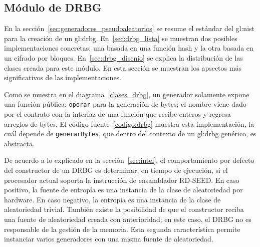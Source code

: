 %
%
%

\subsection{Módulo de DRBG}
\label{sec:implementacion_drbg}

En la sección~\ref{sec:generadores_pseudoaleatorios} se resume el estándar del
\gls{gl:nist} para la  creación de un \gls{gl:drbg}. En~\ref{sec:drbg_lista} se
muestran dos posibles implementaciones concretas: una basada en una función
hash y la  otra basada en un cifrado por bloques. En~\ref{sec:drbg_disenio} se
explica la distribución de las clases creada para este módulo. En esta sección
se muestran los apsectos más significativos de las implementaciones.


Como se muestra en el diagrama~\ref{clases_drbg}, un generador solamente
expone una función pública: \texttt{operar} para la generación de bytes; el
nombre viene dado por el contrato con la interfaz de una función que
recibe enteros y regresa arreglos de bytes. El código fuente~\ref{codigo:drbg}
muestra esta implementación, la cuál depende de \texttt{generarBytes}, que
dentro del contexto de un \gls{gl:drbg} genérico, es abstracta.

De acuerdo a lo explicado en la sección~\ref{sec:intel}, el comportamiento por
defecto del constructor de un DRBG es determinar, en tiempo de ejecución, si el
procesador actual soporta la instrucción de ensamblador RD-SEED. En caso
positivo, la fuente de entropía es una instancia de la clase de aleatoriedad
por hardware. En caso negativo, la entropía es una instancia de la clase de
aleatoriedad trivial. También existe la posibilidad de que el constructor
reciba una fuente de aleatoriedad creada con anterioridad; en este caso, el
DRBG no es responsable de la gestión de la memoria. Esta segunda
característica permite instanciar varios generadores con una misma fuente de
aleatoriedad.



